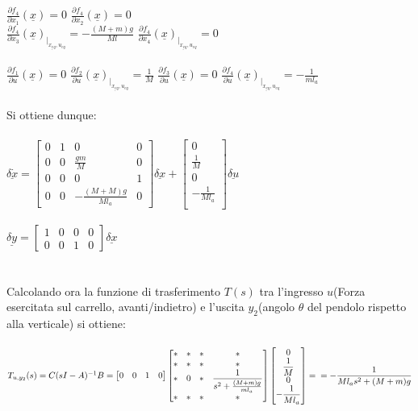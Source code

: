 $\displaystyle\frac{\partial{f_4}}{\partial{x_1}}(\underline{x})=0$\quad
$\displaystyle\frac{\partial{f_4}}{\partial{x_2}}(\underline{x})=0$\\
$\displaystyle\frac{\partial{f_4}}{\partial{x_3}}(\underline{x})_{\big|_{\underline{x_{eq}}, u_{eq}}}=-\displaystyle\frac{(M+m)g}{Ml}$\quad
$\displaystyle\frac{\partial{f_4}}{\partial{x_4}}(\underline{x})_{\big|_{\underline{x_{eq}}, u_{eq}}}=0$\\\\
$\displaystyle\frac{\partial{f_1}}{\partial{u}}(\underline{x})=0$\quad
$\displaystyle\frac{\partial{f_2}}{\partial{u}}(\underline{x})_{\big|_{\underline{x_{eq}}, u_{eq}}}=\displaystyle\frac{1}{M}$\quad
$\displaystyle\frac{\partial{f_3}}{\partial{u}}(\underline{x})=0$\quad
$\displaystyle\frac{\partial{f_4}}{\partial{u}}(\underline{x})_{\big|_{\underline{x_{eq}}, u_{eq}}}=-\displaystyle\frac{1}{ml_a}$\\\\
Si ottiene dunque:\\\\
$\underline{\delta\dot{x}}=
\begin{bmatrix}
0&1&0&0\\
0&0&\displaystyle\frac{gm}{M}&0\\
0&0&0&1\\
0&0&-\displaystyle\frac{(M+M)g}{Ml_a}&0
\end{bmatrix}
\underline{\delta x}+
\begin{bmatrix}
0\\
\displaystyle\frac{1}{M}\\
0\\
-\displaystyle\frac{1}{Ml_a}\\
\end{bmatrix}
\underline{\delta u}
$\\\\
$\underline{\delta y}=
\begin{bmatrix}
1&0&0&0\\
0&0&1&0
\end{bmatrix}
\underline{\delta x}
$\\\\\\
Calcolando ora la funzione di trasferimento $T(s)$ tra l'ingresso $u$(Forza esercitata sul carrello,
avanti/indietro) e l'uscita $y_2$(angolo $\theta$ del pendolo rispetto alla verticale) si ottiene:\\\\
$T_{u,y_2}(s)=C(sI-A)^{-1}B=
\begin{bmatrix}
0&0&1&0
\end{bmatrix}
\begin{bmatrix}
*&*&*&*\\
*&*&*&*\\
*&0&*&\displaystyle\frac{1}{s^2+\frac{(M+m)g}{ml_a}}\\
*&*&*&*
\end{bmatrix}
\begin{bmatrix}
0\\
\displaystyle\frac{1}{M}\\
0\\
-\displaystyle\frac{1}{Ml_a}\\
\end{bmatrix} = \\
=-\displaystyle\frac{1}{Ml_as^2+(M+m)g}
$